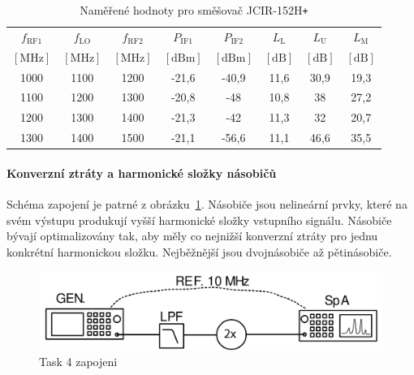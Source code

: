 \documentclass[11pt,a4paper]{article}
\newcommand{\plus}{{\texttt{+}}}
\begin{document}
\begin{table}[!ht]
    \centering
    \begin{tabular}{| c | c | c || c | c || c | c | c |}
        \hline
        $f_{\mathrm{RF1}}$ & $f_{\mathrm{LO}}$ & $f_{\mathrm{RF2}}$ & $P_{\mathrm{IF1}}$ & $P_{\mathrm{IF2}}$ & $L_{\mathrm{L}}$ & $L_{\mathrm{U}}$ & $L_{\mathrm{M}}$\\
        $[\mathrm{MHz}]$ & $[\mathrm{MHz}]$ & $[\mathrm{MHz}]$ & $[\mathrm{dBm}]$ & $[\mathrm{dBm}]$ & $[\mathrm{dB}]$ & $[\mathrm{dB}]$ & $[\mathrm{dB}]$\\
        \hline\hline
        1000 & 1100 & 1200 & -21,6 & -40,9 & 11,6 & 30,9 & 19,3\\
        \hline
        1100 & 1200 & 1300 & -20,8 & -48 & 10,8 & 38 & 27,2\\
        \hline
        1200 & 1300 & 1400 & -21,3 & -42 & 11,3 & 32 & 20,7\\
        \hline
        1300 & 1400 & 1500 & -21,1 & -56,6 & 11,1 & 46,6 & 35,5\\
        \hline
    \end{tabular}
    \caption{Naměřené hodnoty pro směšovač JCIR-152H\plus}
    \label{table:task3-data_JCIR-152H+}
\end{table}

\paragraph*{Konverzní ztráty a harmonické složky násobičů} Schéma zapojení je patrné z obrázku~\ref{fig:task4-zapojeni}. Násobiče jsou nelineární prvky, které na svém výstupu produkují vyšší harmonické složky vstupního signálu. Násobiče bývají optimalizovány tak, aby měly co nejnižší konverzní ztráty pro jednu konkrétní harmonickou složku. Nejběžnější jsou dvojnásobiče až pětinásobiče.
\begin{figure}[!ht]
    \centering
    \includegraphics[width=.65\textwidth]{src/task4-zapojeni.png}
    \caption{Task 4 zapojeni}
    \label{fig:task4-zapojeni}
\end{figure}
\end{document}
